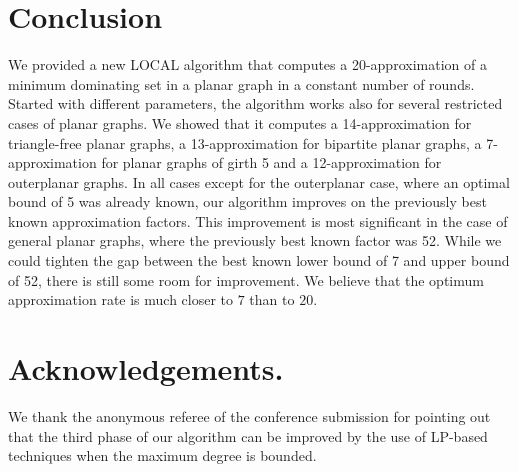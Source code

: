 
\section{Conclusion}

  We provided a new LOCAL algorithm that computes a
  20\hspace{1pt}-\hspace{1pt}approximation of
  a minimum dominating set in a planar graph in a constant number of
  rounds. Started with different parameters, the algorithm works also
  for several restricted cases of planar graphs. We showed that
  it computes a 14\hspace{1pt}-\hspace{1pt}approximation for
  triangle-free planar graphs, a 13\hspace{1pt}-\hspace{1pt}approximation
  for bipartite planar graphs, a 7\hspace{1pt}-\hspace{1pt}approximation
  for planar graphs of girth 5 and a 12\hspace{1pt}-\hspace{1pt}approximation
  for outerplanar graphs. In all cases except for the outerplanar case,
  where an optimal bound of 5 was already known, our algorithm
  improves on the previously best known approximation factors.
  This improvement is most significant in the case of general planar
  graphs, where the previously best known factor was 52.
  While we could tighten the gap between the best known lower bound of 7
  and upper bound of 52, there is still some room for improvement. We
  believe that the optimum approximation rate is much closer to $7$ than
  to $20$.
  
  
  \section*{Acknowledgements.} We thank the anonymous
  referee of the conference submission \cite{heydt2021local}  for pointing 
  out that the third phase of our algorithm can be
  improved by the use of LP-based techniques when the maximum
  degree is bounded.
